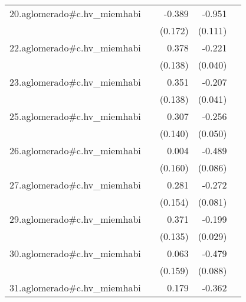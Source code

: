 {\begin{longtable}{l*{4}{D{.}{.}{-1}}}
\addlinespace
20.aglomerado#c.hv\_miemhabi&                     &      -0.389\sym{*}  &      -0.951\sym{***}&                     \\
            &                     &     (0.172)         &     (0.111)         &                     \\
\addlinespace
22.aglomerado#c.hv\_miemhabi&                     &       0.378\sym{**} &      -0.221\sym{***}&                     \\
            &                     &     (0.138)         &     (0.040)         &                     \\
\addlinespace
23.aglomerado#c.hv\_miemhabi&                     &       0.351\sym{*}  &      -0.207\sym{***}&                     \\
            &                     &     (0.138)         &     (0.041)         &                     \\
\addlinespace
25.aglomerado#c.hv\_miemhabi&                     &       0.307\sym{*}  &      -0.256\sym{***}&                     \\
            &                     &     (0.140)         &     (0.050)         &                     \\
\addlinespace
26.aglomerado#c.hv\_miemhabi&                     &       0.004         &      -0.489\sym{***}&                     \\
            &                     &     (0.160)         &     (0.086)         &                     \\
\addlinespace
27.aglomerado#c.hv\_miemhabi&                     &       0.281         &      -0.272\sym{***}&                     \\
            &                     &     (0.154)         &     (0.081)         &                     \\
\addlinespace
29.aglomerado#c.hv\_miemhabi&                     &       0.371\sym{**} &      -0.199\sym{***}&                     \\
            &                     &     (0.135)         &     (0.029)         &                     \\
\addlinespace
30.aglomerado#c.hv\_miemhabi&                     &       0.063         &      -0.479\sym{***}&                     \\
            &                     &     (0.159)         &     (0.088)         &                     \\
\addlinespace
31.aglomerado#c.hv\_miemhabi&                     &       0.179         &      -0.362\sym{***}&                     \\

\end{longtable}}
